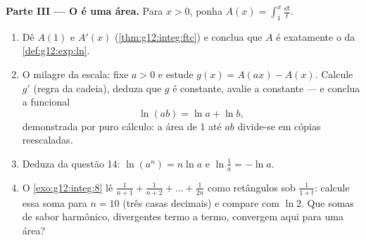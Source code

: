 \begin{problem}
\medskip
\noindent\textbf{Parte III --- O  é uma área.}
Para $x > 0$, ponha $A(x) = \displaystyle\int_1^x \frac{\dd t}{t}$.
\begin{enumerate}[resume]
  \item Dê $A(1)$ e $A'(x)$ (\cref{thm:g12:integ:ftc}) e conclua
        que $A$ é exatamente o  da
        \cref{def:g12:exp:ln}.
  \item O milagre da escala: fixe $a > 0$ e estude
        $g(x) = A(ax) - A(x)$. Calcule $g'$ (regra da cadeia),
        deduza que $g$ é constante, avalie a constante --- e
        conclua a  funcional
        \[
        \ln(ab) = \ln a + \ln b ,
        \]
        demonstrada por puro cálculo: a área de $1$ até $ab$
        divide-se em cópias reescaladas.
  \item Deduza da questão 14: $\ln(a^n) = n\ln a$ e
        $\ln\frac1a = -\ln a$.
  \item O \cref{exo:g12:integ:8} lê
        $\frac{1}{n+1} + \frac{1}{n+2} + \dots + \frac{1}{2n}$
        como retângulos sob $\frac{1}{1 + t}$: calcule essa soma
        para $n = 10$ (três casas decimais) e compare com
        $\ln 2$. Que somas de sabor harmônico, divergentes termo
        a termo, convergem aqui para uma área?
\end{enumerate}


\end{problem}
